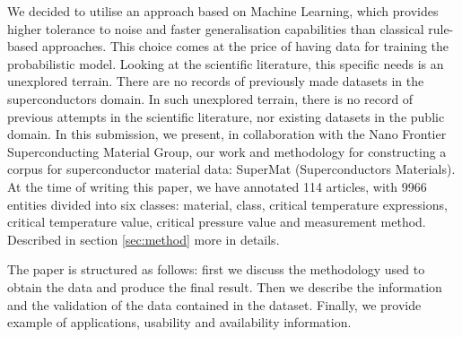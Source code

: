 \documentclass[a4paper,10pt]{article}
\begin{document}
We decided to utilise an approach based on Machine Learning, which provides higher tolerance to noise and faster generalisation capabilities than classical rule-based approaches. This choice comes at the price of having data for training the probabilistic model. Looking at the scientific literature, this specific needs is an unexplored terrain. There are no records of previously made datasets in the superconductors domain. 
In such unexplored terrain, there is no record of previous attempts in the scientific literature, nor existing datasets in the public domain. 
In this submission, we present, in collaboration with the Nano Frontier Superconducting Material Group, our work and methodology for constructing a corpus for superconductor material data: SuperMat (Superconductors Materials). At the time of writing this paper, we have annotated 114 articles, with 9966 entities divided into six classes: material, class, critical temperature expressions, critical temperature value, critical pressure value and measurement method. Described in section \ref{sec:method} more in details. 

The paper is structured as follows: first we discuss the methodology used to obtain the data and produce the final result. Then we describe the information and the validation of the data contained in the dataset. Finally, we provide example of applications, usability and availability information. 





\end{document}
